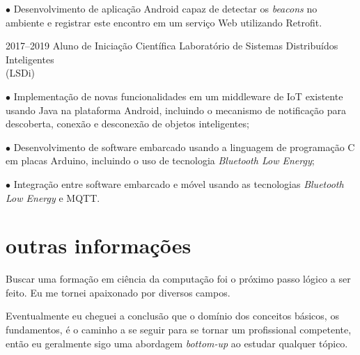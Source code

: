 \documentclass[]{../document-class/twentysecondcv}
\begin{document}
\begin{twenty}
{			$\bullet$ Desenvolvimento de aplicação Android capaz de detectar os \textit{beacons} no ambiente e registrar este encontro em um serviço Web utilizando Retrofit.}
			
	\twentyitem
		{2017--2019} %
		{Aluno de Iniciação Científica} %
		{Laboratório de Sistemas Distribuídos Inteligentes \\\hspace*{\fill}(LSDi)}
		{$\bullet$ Implementação de novas funcionalidades em um middleware de IoT existente usando Java na plataforma Android, incluindo o mecanismo de notificação para descoberta, conexão e desconexão de objetos inteligentes;\vskip 4pt 

			
		$\bullet$ Desenvolvimento de software embarcado usando a linguagem de programação C em placas Arduino, incluindo o uso de tecnologia \textit{Bluetooth Low Energy};\vskip 4pt 
		

		$\bullet$ Integração entre software embarcado e móvel usando as tecnologias \textit{Bluetooth Low Energy} e MQTT.}

		


\end{twenty}


\section{outras informações}

Buscar uma formação em ciência da computação foi o próximo passo lógico a ser feito. Eu me tornei apaixonado por diversos campos.

Eventualmente eu cheguei a conclusão que o domínio dos conceitos básicos, os fundamentos, é o caminho a se seguir para se tornar um profissional competente, então eu geralmente sigo uma abordagem \textit{bottom-up} ao estudar qualquer tópico.





\end{document}

